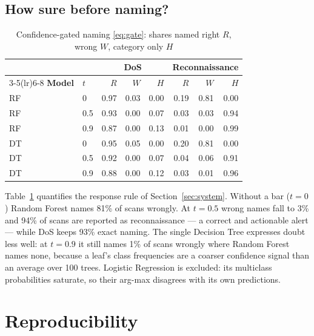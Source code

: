 \documentclass[conference]{IEEEtran}
\begin{document}
\subsection{How sure before naming?}
\label{sec:confidence}

\begin{table}[!t]
\caption{Confidence-gated naming \eqref{eq:gate}: shares named right $R$, wrong $W$, category only $H$}
\label{tab:gate}
\centering
\footnotesize
\begin{tabular}{@{}llrrrrrr@{}}
\toprule
 & & \multicolumn{3}{c}{\textbf{DoS}} & \multicolumn{3}{c}{\textbf{Reconnaissance}} \\
\cmidrule(lr){3-5}\cmidrule(lr){6-8}
\textbf{Model} & $t$ & $R$ & $W$ & $H$ & $R$ & $W$ & $H$ \\
\midrule
RF & 0   & 0.97 & 0.03 & 0.00 & 0.19 & 0.81 & 0.00 \\
RF & 0.5 & 0.93 & 0.00 & 0.07 & 0.03 & 0.03 & 0.94 \\
RF & 0.9 & 0.87 & 0.00 & 0.13 & 0.01 & 0.00 & 0.99 \\
\midrule
DT & 0   & 0.95 & 0.05 & 0.00 & 0.20 & 0.81 & 0.00 \\
DT & 0.5 & 0.92 & 0.00 & 0.07 & 0.04 & 0.06 & 0.91 \\
DT & 0.9 & 0.88 & 0.00 & 0.12 & 0.03 & 0.01 & 0.96 \\
\bottomrule
\end{tabular}
\end{table}

Table~\ref{tab:gate} quantifies the response rule of Section~\ref{sec:system}. Without a bar ($t = 0$) Random Forest names 81\% of scans wrongly. At $t = 0.5$ wrong names fall to 3\% and 94\% of scans are reported as reconnaissance --- a correct and actionable alert --- while DoS keeps 93\% exact naming. The single Decision Tree expresses doubt less well: at $t = 0.9$ it still names 1\% of scans wrongly where Random Forest names none, because a leaf's class frequencies are a coarser confidence signal than an average over 100 trees. Logistic Regression is excluded: its multiclass probabilities saturate, so their arg-max disagrees with its own predictions.

\section{Reproducibility}
\label{sec:repro}
\end{document}

